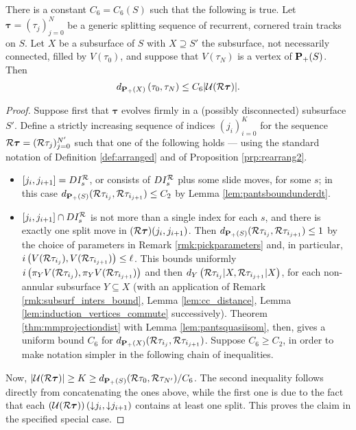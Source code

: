 \begin{prop}\label{prp:easyttbound}
There is a constant $C_6=C_6(S)$ such that the following is true. Let $\bm\tau=(\tau_j)_{j=0}^N$ be a generic splitting sequence of recurrent, cornered train tracks on $S$. Let $X$ be a subsurface of $S$ with $X\supseteq S'$ the subsurface, not necessarily connected, filled by $V(\tau_0)$, and suppose that $V(\tau_N)$ is a vertex of ${\mathbf{P}_+}(S)$. Then
$$d_{{\mathbf{P}_+}(X)}\left(\tau_0,\tau_N\right)\leq C_6 |{\mathcal U}({\mathcal R}\bm\tau)|.$$
\end{prop}
\begin{proof}
Suppose first that $\bm\tau$ evolves firmly in a (possibly disconnected) subsurface $S'$. Define a strictly increasing sequence of indices $(j_i)_{i=0}^{K}$ for the sequence ${\mathcal R}\bm\tau=({\mathcal R}\tau_j)_{j=0}^{N'}$ such that one of the following holds --- using the standard notation of Definition \ref{def:arranged} and of Proposition \ref{prp:rearrang2}.
\begin{itemize}
\item $[j_i,j_{i+1}]=DI^{\mathcal R}_s$, or consists of $DI^{\mathcal R}_s$ plus some slide moves, for some $s$; in this case $d_{{\mathbf{P}_+}(S)}({\mathcal R}\tau_{i_j},{\mathcal R}\tau_{i_{j+1}})\leq C_2$ by Lemma \ref{lem:pantsboundunderdt}.
\item $[j_i,j_{i+1}]\cap DI^{\mathcal R}_s$ is not more than a single index for each $s$, and there is exactly one split move in $({\mathcal R}\bm\tau)(j_i,j_{i+1})$. Then $d_{{\mathbf{P}_+}(S)}({\mathcal R}\tau_{i_j},{\mathcal R}\tau_{i_{j+1}})\leq 1$ by the choice of parameters in Remark \ref{rmk:pickparameters} and, in particular, $i\left(V({\mathcal R}\tau_{i_j}),V({\mathcal R}\tau_{i_{j+1}})\right)\leq \ell$. This bounds uniformly $i\left(\pi_Y V({\mathcal R}\tau_{i_j}),\pi_Y V({\mathcal R}\tau_{i_{j+1}})\right)$ and then $d_Y\left({\mathcal R}\tau_{i_j}|X,{\mathcal R}\tau_{i_{j+1}}|X\right)$, for each non-annular subsurface $Y\subseteq X$ (with an application of Remark \ref{rmk:subsurf_inters_bound}, Lemma \ref{lem:cc_distance}, Lemma \ref{lem:induction_vertices_commute} successively). Theorem \ref{thm:mmprojectiondist} with Lemma \ref{lem:pantsquasiisom}, then, gives a uniform bound $C_6$ for $d_{{\mathbf{P}_+}(X)}({\mathcal R}\tau_{i_j},{\mathcal R}\tau_{i_{j+1}})$. Suppose $C_6\geq C_2$, in order to make notation simpler in the following chain of inequalities.
\end{itemize}

Now, $|{\mathcal U}({\mathcal R}\bm\tau)|\geq K\geq d_{{\mathbf{P}_+}(S)}({\mathcal R}\tau_0,{\mathcal R}\tau_{N'})/C_6$. The second inequality follows directly from concatenating the ones above, while the first one is due to the fact that each $\left({\mathcal U}({\mathcal R}\bm\tau)\right)(\mathord{\downarrow} j_i, \mathord{\downarrow} j_{i+1})$ contains at least one split. This proves the claim in the specified special case.


\end{proof}
